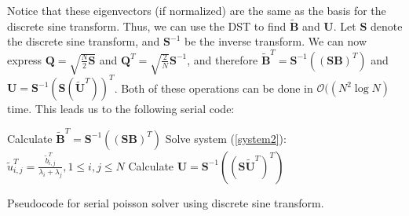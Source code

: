 Notice that these eigenvectors (if normalized) are the same as the basis for the discrete sine transform. Thus, we can use the DST to find $\mathbf{\widetilde{B}}$ and $\mathbf{U}$. Let $\mathbf{S}$ denote the discrete sine transform, and $\mathbf{S}^{-1}$ be the inverse transform. We can now express $\mathbf{Q} = \sqrt{\frac{N}{2}\mathbf{S}}$ and $\mathbf{Q}^T = \sqrt{\frac{2}{N}}\mathbf{S}^{-1}$, and therefore $\mathbf{\widetilde{B}}^T = \mathbf{S}^{-1}((\mathbf{SB})^T)$ and $\mathbf{U} = \mathbf{S}^{-1}(\mathbf{S}(\mathbf{\widetilde{U}}^T))^T$. Both of these operations can be done in $\mathcal{O}((N^2\log{N})$ time. 
This leads us to the following serial code:\\

\begin{algorithm}[H]
 Calculate $\mathbf{\widetilde{B}}^T = \mathbf{S}^{-1}((\mathbf{SB})^T)$  \;
 Solve system (\ref{system2}): $\tilde{u}^T_{i,j} = \frac{\tilde{b}^T_{i,j}}{\lambda_i + \lambda_j}, 1 \leq i, j \leq N$\;
 Calculate $\mathbf{U} = \mathbf{S}^{-1}((\mathbf{S}\mathbf{\tilde{U}}^T)^T)$ \;
 \caption{Pseudocode for serial poisson solver using discrete sine transform.}
 \label{code:serial}
\end{algorithm}
